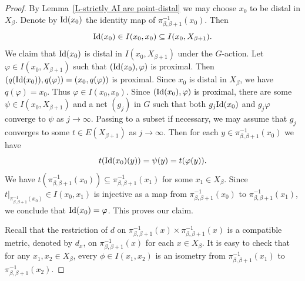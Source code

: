 \documentclass[11pt]{amsart}
\theoremstyle{definition}
\numberwithin{equation}{section}
\theoremstyle{definition}
\begin{document}
\begin{proof}
By Lemma~\ref{L-strictly AI are point-distal} we may choose $x_0$ to be  distal in $X_\beta$.
Denote by ${\rm Id}(x_0)$ the identity map of $\pi_{\beta, \beta+1}^{-1}(x_0)$. Then 
$${\rm Id}(x_0)\in I(x_0, x_0)\subseteq I(x_0, X_{\beta+1}).$$ 
We claim that ${\rm Id}(x_0)$ is distal in $I(x_0, X_{\beta+1})$ under the $G$-action. Let $\varphi\in I(x_0, X_{\beta+1})$ such that $({\rm Id}(x_0), \varphi)$ is proximal. Then $(q({\rm Id}(x_0)), q(\varphi))=(x_0, q(\varphi))$ is proximal. Since $x_0$ is distal in $X_\beta$, we have $q(\varphi)=x_0$. Thus $\varphi\in I(x_0, x_0)$. Since $({\rm Id}(x_0), \varphi)$ is proximal, there are some $\psi\in I(x_0, X_{\beta+1})$ and  a net $(g_j)$ in $G$ such that both $g_j{\rm Id}(x_0)$ and $g_j\varphi$ converge to $\psi$ as $j\to \infty$. Passing to a subset if necessary, we may assume that $g_j$ converges to some $t\in E(X_{\beta+1})$ as $j\to \infty$. Then for each $y\in \pi_{\beta, \beta+1}^{-1}(x_0)$ we have
$$ t({\rm Id}(x_0)(y))=\psi(y)=t(\varphi(y)).$$
We have $t(\pi_{\beta, \beta+1}^{-1}(x_0))\subseteq \pi_{\beta, \beta+1}^{-1}(x_1)$ for some $x_1\in X_\beta$. 
Since $t|_{\pi_{\beta, \beta+1}^{-1}(x_0)}\in I(x_0, x_1)$ is injective as a map from $\pi_{\beta, \beta+1}^{-1}(x_0)$ to $\pi_{\beta, \beta+1}^{-1}(x_1)$, we conclude that ${\rm Id}(x_0)=\varphi$. This proves our claim. 




Recall that the restriction of $d$ on $\pi_{\beta, \beta+1}^{-1}(x)\times \pi_{\beta, \beta+1}^{-1}(x)$ is a compatible metric, denoted by $d_x$, on $\pi_{\beta, \beta+1}^{-1}(x)$ for each $x\in X_\beta$. It is easy to check that for any $x_1, x_2\in X_\beta$, every $\phi\in I(x_1, x_2)$ is an isometry from $\pi_{\beta, \beta+1}^{-1}(x_1)$ to $\pi_{\beta, \beta+1}^{-1}(x_2)$.



\end{proof}
\end{document}
